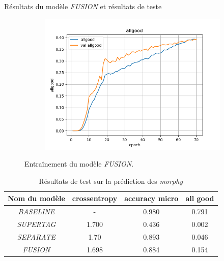 \documentclass[11pt]{beamer}
\begin{document}
\begin{frame}{Résultats du modèle \textit{FUSION} et résultats de teste}
\begin{figure}
\begin{subfigure}{0.32\textwidth}
            \centering
            \includegraphics[width=\linewidth]{../logs/fusion/allgood.png}
        \end{subfigure}
        \caption{Entraînement du modèle \textit{FUSION}.}
        \label{fig: results fusion}
    \end{figure}

    \begin{table}
        \centering
        \begin{tabular}{|c|c|c|c|}
            \hline
             Nom du modèle & crossentropy & accuracy micro & all good\\
             \hline
             \textit{BASELINE}& - & 0.980 & 0.791 \\
             \hline
             \textit{SUPERTAG}& 1.700 & 0.436 & 0.002\\
             \hline
             \textit{SEPARATE}& 1.70 & 0.893 & 0.046\\
             \hline
             \textit{FUSION}& 1.698 & 0.884 & 0.154 \\
             \hline
        \end{tabular}
        \caption{Résultats de test sur la prédiction des \textit{morphy}}
        \label{tab: test morphy}
    \end{table}
\end{frame}
\end{document}
